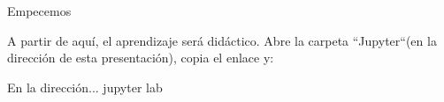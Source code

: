 \begin{frame}[t]{Empecemos}\vspace{10pt}

A partir de aqu\'i, el aprendizaje ser\'a did\'actico. Abre la carpeta ``Jupyter``(en la direcci\'on de esta presentaci\'on), copia el enlace y:

\begin{block}{En la direcci\'on...}
	jupyter lab
\end{block}


\end{frame}